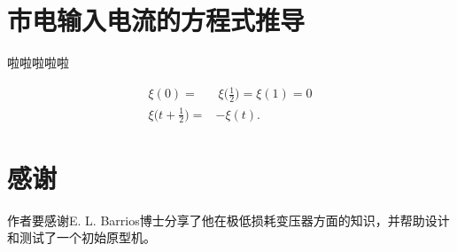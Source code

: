 \documentclass[journal]{IEEEtran}
\begin{document}
%


\appendices
\section{市电输入电流的方程式推导}


啦啦啦啦啦

\vspace*{-1em} 
\begin{align}
\xi (0) = & \ \xi \biggr(\frac{1}{2}\biggr)=\xi(1)=0 \\
\xi \biggr(t+\frac{1}{2}\biggr) = & - \xi(t).
\end{align}






\section*{感谢}

作者要感谢E. L. Barrios博士分享了他在极低损耗变压器方面的知识，并帮助设计和测试了一个初始原型机。


\ifCLASSOPTIONcaptionsoff
\newpage
\fi



\end{document}
